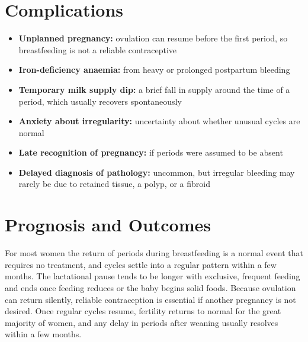 \section*{Complications}
\begin{itemize}
    \item \textbf{Unplanned pregnancy:} ovulation can resume before the first period, so breastfeeding is not a reliable contraceptive
    \item \textbf{Iron-deficiency anaemia:} from heavy or prolonged postpartum bleeding
    \item \textbf{Temporary milk supply dip:} a brief fall in supply around the time of a period, which usually recovers spontaneously
    \item \textbf{Anxiety about irregularity:} uncertainty about whether unusual cycles are normal
    \item \textbf{Late recognition of pregnancy:} if periods were assumed to be absent
    \item \textbf{Delayed diagnosis of pathology:} uncommon, but irregular bleeding may rarely be due to retained tissue, a polyp, or a fibroid
\end{itemize}

\section*{Prognosis and Outcomes}
For most women the return of periods during breastfeeding is a normal event that requires no treatment, and cycles settle into a regular pattern within a few months. The lactational pause tends to be longer with exclusive, frequent feeding and ends once feeding reduces or the baby begins solid foods. Because ovulation can return silently, reliable contraception is essential if another pregnancy is not desired. Once regular cycles resume, fertility returns to normal for the great majority of women, and any delay in periods after weaning usually resolves within a few months.

